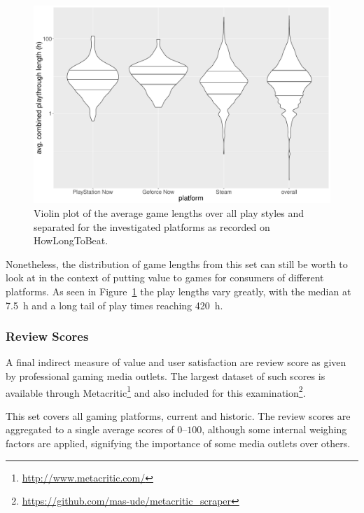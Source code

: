 \begin{figure}[!t]
	\centering
	\includegraphics[width=1.0\columnwidth]{images/gamelengths-by-platform-violin.pdf}
	\caption{Violin plot of the average game lengths over all play styles and separated for the investigated platforms as recorded on HowLongToBeat.}
\label{fig:gamelengths-violin}
\end{figure}

Nonetheless, the distribution of game lengths from this set can still be worth to look at in the context of putting value to games for consumers of different platforms. As seen in Figure~\ref{fig:gamelengths-violin} the play lengths vary greatly, with the median at \SI{7.5}{\hour} and a long tail of play times reaching \SI{420}{\hour}.



\subsubsection{Review Scores}

A final indirect measure of value and user satisfaction are review score as given by professional gaming media outlets. The largest dataset of such scores is available through Metacritic\footnote{\url{http://www.metacritic.com/}} and also included for this examination\footnote{\url{https://github.com/mas-ude/metacritic_scraper}}.

This set covers all gaming platforms, current and historic. The review scores are aggregated to a single average scores of $0$--$100$, although some internal weighing factors are applied, signifying the importance of some media outlets over others.

